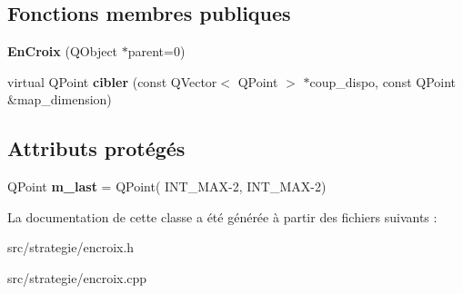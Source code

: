 \subsection*{Fonctions membres publiques}
\begin{DoxyCompactItemize}
\item 
{\bfseries En\+Croix} (Q\+Object $\ast$parent=0)\hypertarget{class_en_croix_a2d45294635fb84fd174b4f46a8e3fba2}{}\label{class_en_croix_a2d45294635fb84fd174b4f46a8e3fba2}

\item 
virtual Q\+Point {\bfseries cibler} (const Q\+Vector$<$ Q\+Point $>$ $\ast$coup\+\_\+dispo, const Q\+Point \&map\+\_\+dimension)\hypertarget{class_en_croix_a7a93757f1d6b75c6e00c694a39cf3a85}{}\label{class_en_croix_a7a93757f1d6b75c6e00c694a39cf3a85}

\end{DoxyCompactItemize}
\subsection*{Attributs protégés}
\begin{DoxyCompactItemize}
\item 
Q\+Point {\bfseries m\+\_\+last} = Q\+Point( I\+N\+T\+\_\+\+M\+AX-\/2, I\+N\+T\+\_\+\+M\+AX-\/2)\hypertarget{class_en_croix_a526cf92dd33b7cf2f27c48ec1b9e6ffe}{}\label{class_en_croix_a526cf92dd33b7cf2f27c48ec1b9e6ffe}

\end{DoxyCompactItemize}


La documentation de cette classe a été générée à partir des fichiers suivants \+:\begin{DoxyCompactItemize}
\item 
src/strategie/encroix.\+h\item 
src/strategie/encroix.\+cpp\end{DoxyCompactItemize}

